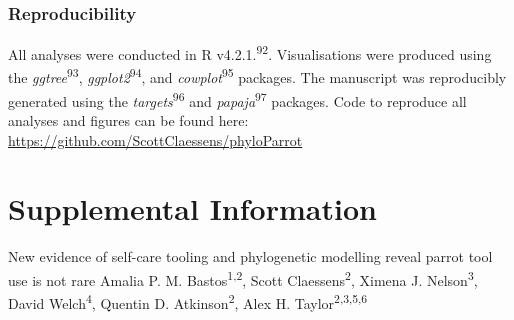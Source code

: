 \documentclass[
  man, donotrepeattitle,floatsintext]{apa6}
\begin{document}
\hypertarget{reproducibility}{%
\subsubsection{Reproducibility}\label{reproducibility}}

All analyses were conducted in R v4.2.1.\textsuperscript{92}. Visualisations were
produced using the \emph{ggtree}\textsuperscript{93}, \emph{ggplot2}\textsuperscript{94}, and \emph{cowplot}\textsuperscript{95} packages. The manuscript was reproducibly generated using the
\emph{targets}\textsuperscript{96} and \emph{papaja}\textsuperscript{97} packages. Code to reproduce all
analyses and figures can be found here:
\url{https://github.com/ScottClaessens/phyloParrot}

\newpage
\nolinenumbers
\vspace*{60mm}

\renewcommand{\figurename}{Figure}
\renewcommand{\tablename}{Table}
\renewcommand{\thefigure}{S\arabic{figure}} \setcounter{figure}{0}
\renewcommand{\thetable}{S\arabic{table}} \setcounter{table}{0}
\renewcommand{\theequation}{S\arabic{equation}} \setcounter{equation}{0}

\hypertarget{supplemental-information}{%
\section{\texorpdfstring{\textbf{Supplemental Information}}{Supplemental Information}}\label{supplemental-information}}

\setcounter{page}{1}
\centering

\noindent \hspace*{5mm} \small New evidence of self-care tooling and phylogenetic modelling reveal parrot tool use is not rare \newline
\hspace*{1cm} \small Amalia P. M. Bastos\textsuperscript{1,2}, Scott Claessens\textsuperscript{2}, Ximena J. Nelson\textsuperscript{3}, David Welch\textsuperscript{4}, \newline
\hspace*{25mm} Quentin D. Atkinson\textsuperscript{2}, Alex H. Taylor\textsuperscript{2,3,5,6} \newline

\raggedright
\end{document}
